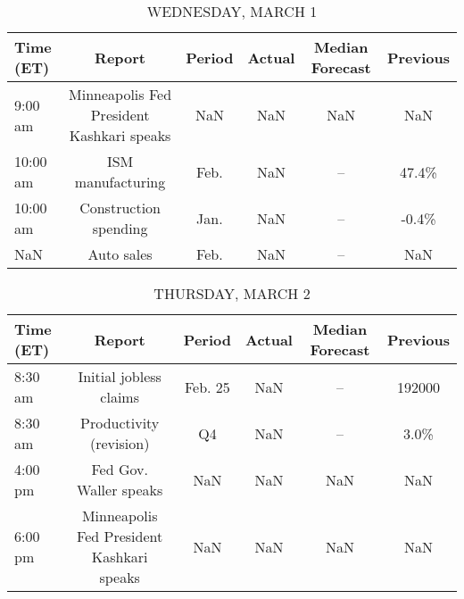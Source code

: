 \documentclass{article}%
\begin{document}
%


\begin{table}[htbp]%
\caption{WEDNESDAY, MARCH 1}%
\centering%
\begin{adjustbox}{width=1\textwidth}%
\begin{tabular}{lccccc}
\toprule
Time (ET) &                                    Report & Period & Actual & Median Forecast & Previous \\
\midrule
  9:00 am & Minneapolis Fed President Kashkari speaks &    NaN &    NaN &             NaN &      NaN \\
 10:00 am &                         ISM manufacturing &   Feb. &    NaN &              -- &    47.4\% \\
 10:00 am &                     Construction spending &   Jan. &    NaN &              -- &    -0.4\% \\
      NaN &                                Auto sales &   Feb. &    NaN &              -- &      NaN \\
\bottomrule
\end{tabular}
%
\end{adjustbox}%
\end{table}

%


\begin{table}[htbp]%
\caption{THURSDAY, MARCH 2}%
\centering%
\begin{adjustbox}{width=1\textwidth}%
\begin{tabular}{lccccc}
\toprule
Time (ET) &                                    Report &  Period & Actual & Median Forecast & Previous \\
\midrule
  8:30 am &                    Initial jobless claims & Feb. 25 &    NaN &              -- &   192000 \\
  8:30 am &                   Productivity (revision) &      Q4 &    NaN &              -- &     3.0\% \\
  4:00 pm &                    Fed Gov. Waller speaks &     NaN &    NaN &             NaN &      NaN \\
  6:00 pm & Minneapolis Fed President Kashkari speaks &     NaN &    NaN &             NaN &      NaN \\
\bottomrule
\end{tabular}
%
\end{adjustbox}%
\end{table}

%
\end{document}
